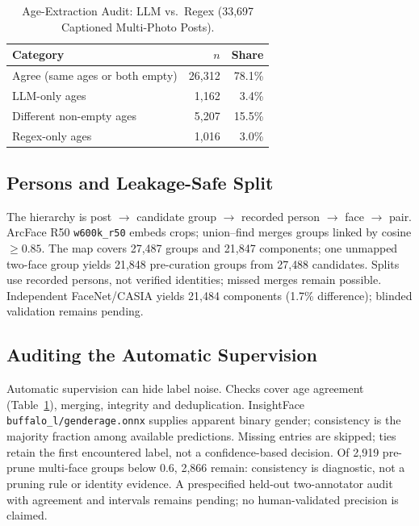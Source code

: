 \documentclass[journal]{IEEEtran}
\begin{document}
\begin{table}[!t]
\renewcommand{\arraystretch}{1.2}
\caption{Age-Extraction Audit: LLM vs.\ Regex (33{,}697 Captioned Multi-Photo Posts).}
\label{tab:age}
\centering
\footnotesize
\begin{tabular}{@{}lrr@{}}
\toprule
Category & $n$ & Share \\
\midrule
Agree (same ages or both empty) & 26{,}312 & 78.1\% \\
LLM-only ages & 1{,}162 & 3.4\% \\
Different non-empty ages & 5{,}207 & 15.5\% \\
Regex-only ages & 1{,}016 & 3.0\% \\
\bottomrule
\end{tabular}
\end{table}

\subsection{Persons and Leakage-Safe Split}\label{sec:data-persons}
The hierarchy is post $\to$ candidate group $\to$ recorded person $\to$ face $\to$ pair. ArcFace R50 \texttt{w600k\_r50} embeds crops; union--find merges groups linked by cosine $\geq0.85$. The map covers 27{,}487 groups and 21{,}847 components; one unmapped two-face group yields 21{,}848 pre-curation groups from 27{,}488 candidates. Splits use recorded persons, not verified identities; missed merges remain possible. Independent FaceNet/CASIA yields 21{,}484 components (1.7\% difference); blinded validation remains pending.

\subsection{Auditing the Automatic Supervision}\label{sec:data-audit}
Automatic supervision can hide label noise. Checks cover age agreement (Table~\ref{tab:age}), merging, integrity and deduplication. InsightFace \texttt{buffalo\_l/genderage.onnx} supplies apparent binary gender; consistency is the majority fraction among available predictions. Missing entries are skipped; ties retain the first encountered label, not a confidence-based decision. Of 2{,}919 pre-prune multi-face groups below 0.6, 2{,}866 remain: consistency is diagnostic, not a pruning rule or identity evidence. A prespecified held-out two-annotator audit with agreement and intervals remains pending; no human-validated precision is claimed.
\end{document}
